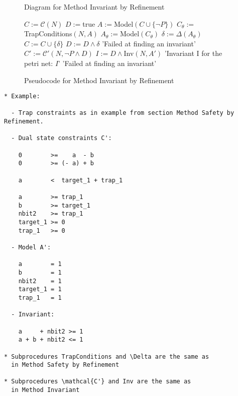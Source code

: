 \documentclass{llncs}
\begin{document}
\begin{figure}
\caption{Diagram for Method Invariant by Refinement}
\label{fig:method-invariant-by-refinement-diagram}
\end{figure}

\begin{figure}
\begin{algorithmic}[1]
\State $C := \mathcal C(N)$
\State $D := $true
  \State $A := $Model$(C \cup \{\neg P\})$
  \State $C_\theta := $TrapConditions$(N, A)$
    \State $A_\theta := $Model$(C_\theta)$
    \State $\delta := \Delta(A_\theta)$
    \State $C := C \cup \{\delta\}$
    \State $D := D \land \delta$
  \Else
    \State \Return 'Failed at finding an invariant'
  \EndIf
\EndWhile
\State $C' := \mathcal C'(N, \neg P \land D)$
  \State $I := D \land $Inv$(N, A')$
  \State \Return 'Invariant I for the petri net: $I$'
\Else
  \State \Return 'Failed at finding an invariant'
\EndIf
\end{algorithmic}
\caption{Pseudocode for Method Invariant by Refinement}
\label{fig:method-invariant-by-refinement-pseudocode}
\end{figure}

\newpage

\begin{verbatim}
* Example:

  - Trap constraints as in example from section Method Safety by Refinement.
  
  - Dual state constraints C':

    0        >=    a  - b
    0        >= (- a) + b

    a        <  target_1 + trap_1

    a        >= trap_1
    b        >= target_1
    nbit2    >= trap_1
    target_1 >= 0
    trap_1   >= 0

  - Model A':

    a        = 1
    b        = 1
    nbit2    = 1
    target_1 = 1
    trap_1   = 1
    
  - Invariant:

    a     + nbit2 >= 1
    a + b + nbit2 <= 1

* Subprocedures TrapConditions and \Delta are the same as
  in Method Safety by Refinement

* Subprocedures \mathcal{C'} and Inv are the same as
  in Method Invariant
\end{verbatim}
\end{document}
